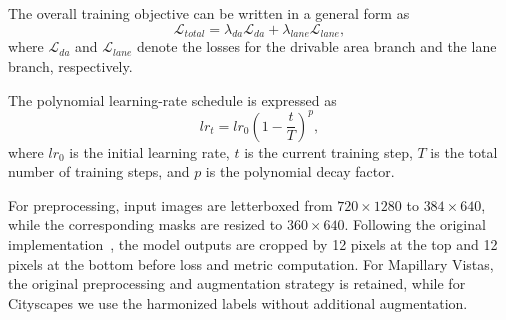 \documentclass[conference]{IEEEtran}
\begin{document}
\begin{table}[!t]
  \centering
  \caption{Training configuration used in this study.}
  \label{tab:train_config}
\end{table}

The overall training objective can be written in a general form as
\begin{equation}
  \mathcal{L}_{total} = \lambda_{da}\mathcal{L}_{da} + \lambda_{lane}\mathcal{L}_{lane},
\end{equation}
where $\mathcal{L}_{da}$ and $\mathcal{L}_{lane}$ denote the losses for the drivable area branch and the lane branch, respectively.

The polynomial learning-rate schedule is expressed as
\begin{equation}
  lr_t = lr_0\left(1 - \frac{t}{T}\right)^{p},
\end{equation}
where $lr_0$ is the initial learning rate, $t$ is the current training step, $T$ is the total number of training steps, and $p$ is the polynomial decay factor.

For preprocessing, input images are letterboxed from $720 \times 1280$ to $384 \times 640$, while the corresponding masks are resized to $360 \times 640$. Following the original implementation~\cite{ref1}, the model outputs are cropped by 12 pixels at the top and 12 pixels at the bottom before loss and metric computation. For Mapillary Vistas, the original preprocessing and augmentation strategy is retained, while for Cityscapes we use the harmonized labels without additional augmentation.
\end{document}
